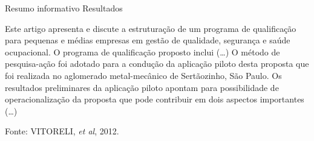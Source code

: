 \documentclass{beamer}
\begin{document}
\begin{frame}{Resumo informativo}
  Resultados
  \begin{example}
    Este artigo apresenta e discute a estruturação de um programa de
    qualificação para pequenas e médias empresas em gestão de
    qualidade, segurança e saúde ocupacional. O programa de
    qualificação proposto inclui (\ldots) O método de pesquisa-ação
    foi adotado para a condução da aplicação piloto desta proposta que
    foi realizada no aglomerado metal-mecânico de Sertãozinho, São
    Paulo. \alert{Os resultados preliminares da aplicação piloto
      apontam para possibilidade de operacionalização da proposta que
      pode contribuir em dois aspectos importantes} (\ldots)
  \end{example}
  Fonte: VITORELI, {\em et al}, 2012.
\end{frame}
\end{document}

